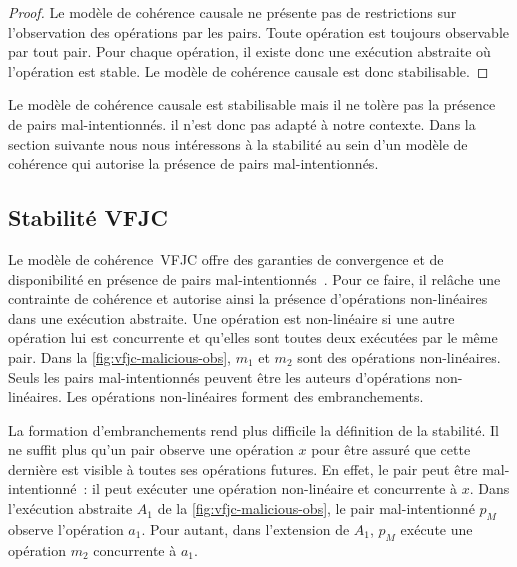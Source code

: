 \begin{proof}
Le modèle de cohérence causale ne présente pas de restrictions sur l'observation des opérations par les pairs.
Toute opération est toujours observable par tout pair.
Pour chaque opération, il existe donc une exécution abstraite où l'opération est stable.
Le modèle de cohérence causale est donc stabilisable.
\end{proof}

Le modèle de cohérence causale est stabilisable mais il ne tolère pas la présence de pairs mal-intentionnés.
il n'est donc pas adapté à notre contexte.
Dans la section suivante nous nous intéressons à la stabilité au sein d'un modèle de cohérence qui autorise la présence de pairs mal-intentionnés.


\subsection{Stabilité \acl{VFJC}}\label{subsec:vfjcs}

Le modèle de cohérence~\acf{VFJC} offre des garanties de convergence et de disponibilité en présence de pairs mal-intentionnés~\autocite{mahajan_2011_cac}.
Pour ce faire, il relâche une contrainte de cohérence et autorise ainsi la présence d'opérations non-linéaires dans une exécution abstraite.
Une opération est non-linéaire si une autre opération lui est concurrente et qu'elles sont toutes deux exécutées par le même pair.
Dans la \autoref{fig:vfjc-malicious-obs}, $m_1$ et $m_2$ sont des opérations non-linéaires.
Seuls les pairs mal-intentionnés peuvent être les auteurs d'opérations non-linéaires.
Les opérations non-linéaires forment des embranchements.

La formation d'embranchements rend plus difficile la définition de la stabilité.
Il ne suffit plus qu'un pair observe une opération $x$ pour être assuré que cette dernière est visible à toutes ses opérations futures.
En effet, le pair peut être mal-intentionné~: il peut exécuter une opération non-linéaire et concurrente à $x$.
Dans l'exécution abstraite $A_1$ de la \autoref{fig:vfjc-malicious-obs}, le pair mal-intentionné $p_M$ observe l'opération $a_1$.
Pour autant, dans l'extension de $A_1$, $p_M$ exécute une opération $m_2$ concurrente à $a_1$.


